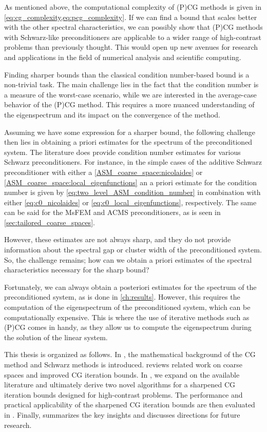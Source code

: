 As mentioned above, the computational complexity of (P)CG methods is given in \cref{eq:cg_complexity,eq:pcg_complexity}. If we can find a bound that scales better with the other spectral characteristics, we can possibly show that (P)CG methods with Schwarz-like preconditioners are applicable to a wider range of high-contrast problems than previously thought. This would open up new avenues for research and applications in the field of numerical analysis and scientific computing.

Finding sharper bounds than the classical condition number-based bound is a non-trivial task. The main challenge lies in the fact that the condition number is a measure of the worst-case scenario, while we are interested in the average-case behavior of the (P)CG method. This requires a more nuanced understanding of the eigenspectrum and its impact on the convergence of the method.

Assuming we have some expression for a sharper bound, the following challenge then lies in obtaining a priori estimates for the spectrum of the preconditioned system. The literature does provide condition number estimates for various Schwarz preconditioners. For instance, in the simple cases of the additive Schwarz preconditioner with either a \ref{ASM_coarse_space:nicolaides} or \ref{ASM_coarse_space:local_eigenfunctions} an a priori estimate for the condition number is given by \cref{eq:two_level_ASM_condition_number} in combination with either \cref{eq:c0_nicolaides} or \cref{eq:c0_local_eigenfunctions}, respectively. The same can be said for the MsFEM and ACMS preconditioners, as is seen in \cref{sec:tailored_coarse_spaces}.

However, these estimates are not always sharp, and they do not provide information about the spectral gap or cluster width of the preconditioned system. So, the challenge remains; how can we obtain a priori estimates of the spectral characteristics necessary for the sharp bound?

Fortunately, we can always obtain a posteriori estimates for the spectrum of the preconditioned system, as is done in \cref{ch:results}. However, this requires the computation of the eigenspectrum of the preconditioned system, which can be computationally expensive. This is where the use of iterative methods such as (P)CG comes in handy, as they allow us to compute the eigenspectrum during the solution of the linear system.

This thesis is organized as follows. In , the mathematical background of the CG method and Schwarz methods is introduced.  reviews related work on coarse spaces and improved CG iteration bounds. In , we expand on the available literature and ultimately derive two novel algorithms for a sharpened CG iteration bounds designed for high-contrast problems. The performance and practical applicability of the sharpened CG iteration bounds are then evaluated in . Finally,  summarizes the key insights and discusses directions for future research.